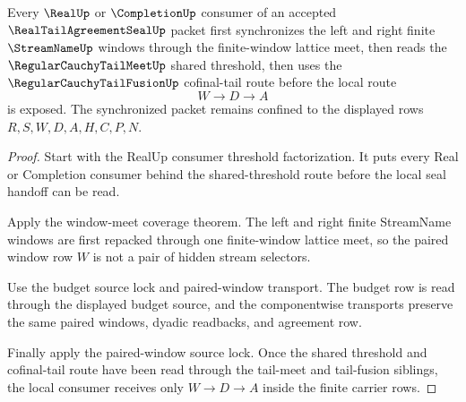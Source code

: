\begin{theorem}
\label{thm:real-tail-agreement-seal-consumer-window-synchronization}
Every $\RealUp$ or $\CompletionUp$ consumer of an accepted $\RealTailAgreementSealUp$ packet first synchronizes the left and right finite $\StreamNameUp$ windows through the finite-window lattice meet, then reads the $\RegularCauchyTailMeetUp$ shared threshold, then uses the $\RegularCauchyTailFusionUp$ cofinal-tail route before the local route
$$
W \to D \to A
$$
is exposed. The synchronized packet remains confined to the displayed rows $R,S,W,D,A,H,C,P,N$.
\end{theorem}
\begin{proof}
Start with the RealUp consumer threshold factorization. It puts every Real or Completion consumer behind the shared-threshold route before the local seal handoff can be read.

Apply the window-meet coverage theorem. The left and right finite StreamName windows are first repacked through one finite-window lattice meet, so the paired window row $W$ is not a pair of hidden stream selectors.

Use the budget source lock and paired-window transport. The budget row is read through the displayed budget source, and the componentwise transports preserve the same paired windows, dyadic readbacks, and agreement row.

Finally apply the paired-window source lock. Once the shared threshold and cofinal-tail route have been read through the tail-meet and tail-fusion siblings, the local consumer receives only $W \to D \to A$ inside the finite carrier rows.
\end{proof}

